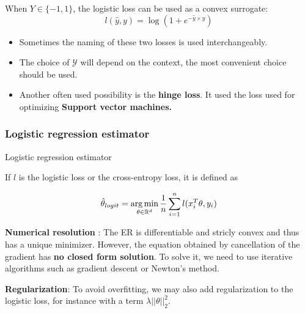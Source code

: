 \documentclass[
10pt, %
a4paper, %
oneside, %
headinclude,footinclude, %
BCOR5mm, %
]{scrartcl}
\begin{document}
\begin{definition}

    When $Y\in \{-1, 1\}$, the logistic loss can be used as a convex surrogate: 
	\begin{equation}
	    \label{loss:logistic}
	    l(\hat{y}, y) = \log(1+e^{- \hat{y}\times y})
	\end{equation}
\end{definition}

\begin{remark}
    \begin{itemize}
	\item Sometimes the naming of these two losses is used interchangeably.
        \item The choice of $ \mathcal{Y} $ will depend on the context, the most convenient choice should be used.
	\item Another often used possibility is the \textbf{{hinge loss}}. It used the loss used for optimizing \textbf{{Support vector machines.}} 
    \end{itemize}
\end{remark}


\subsubsection{\large\color{Periwinkle}Logistic regression estimator}

\begin{definition}{Logistic regression estimator}
    \label{def:logicest}

    If $l$ is the logistic loss or the cross-entropy loss, it is defined as

    \begin{equation}
	\hat{\theta}_{logit} = \operatorname*{arg\,min}_{\theta\in \mathbb{R}^d} \frac{1}{n} \sum^{n}_{i=1} l(x_i^T\theta, y_i) 
    \end{equation}
\end{definition}

\textbf{{Numerical resolution}} : The ER is differentiable and stricly convex and thus has a unique minimizer. However, the equation obtained by cancellation of the gradient has \textbf{{no closed form solution}}. To solve it, we need to use iterative algorithms such as gradient descent or Newton's method.

\textbf{{Regularization}}: To avoid overfitting, we may also add regularization to the logistic loss, for instance with a term $ \lambda || \theta||_2^2$.
\end{document}
